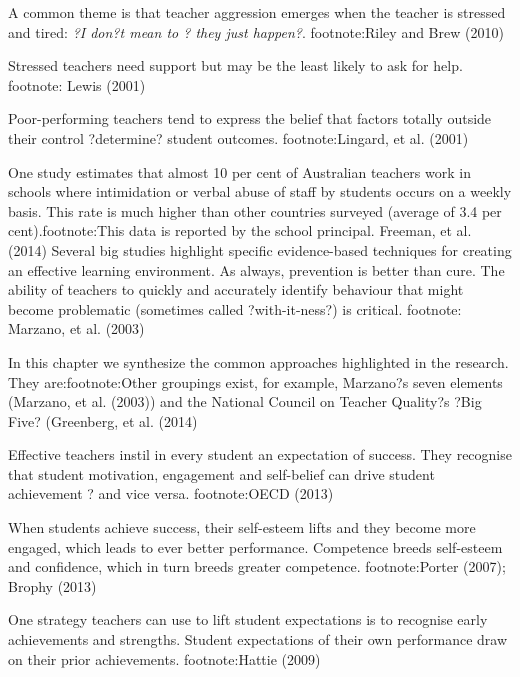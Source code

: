 A common theme is that teacher aggression emerges when the teacher is stressed and tired: \emph{?I don?t mean to ? they just happen?}. footnote:Riley and Brew (2010)

Stressed teachers need support but may be the least likely to ask for help. footnote: Lewis (2001)

Poor-performing teachers tend to express the belief that factors totally outside their control ?determine? student outcomes. footnote:Lingard, et al. (2001)

One study estimates that almost 10 per cent of Australian teachers work in schools where intimidation or verbal abuse of staff by students occurs on a weekly basis. This rate is much higher than other countries surveyed (average of 3.4 per cent).footnote:This data is reported by the school principal. Freeman, et al. (2014)
Several big studies highlight specific evidence-based techniques for creating an effective learning environment. %
As always, prevention is better than cure. The ability of teachers to quickly and accurately identify behaviour that might become problematic (sometimes called ?with-it-ness?) is critical. footnote: Marzano, et al. (2003)

In this chapter we synthesize the common approaches highlighted in the research. They are:footnote:Other groupings exist, for example, Marzano?s seven elements (Marzano, et al. (2003)) and the National Council on Teacher Quality?s ?Big Five? (Greenberg, et al. (2014)

Effective teachers instil in every student an expectation of success. They recognise that student motivation, engagement and self-belief can drive student achievement ? and vice versa. footnote:OECD (2013) 

When students achieve success, their self-esteem lifts and they become more engaged, which leads to ever better performance. Competence breeds self-esteem and confidence, which in turn breeds greater competence. footnote:Porter (2007); Brophy (2013) 

One strategy teachers can use to lift student expectations is to recognise early achievements and strengths. Student expectations of their own performance draw on their prior achievements. footnote:Hattie (2009)

